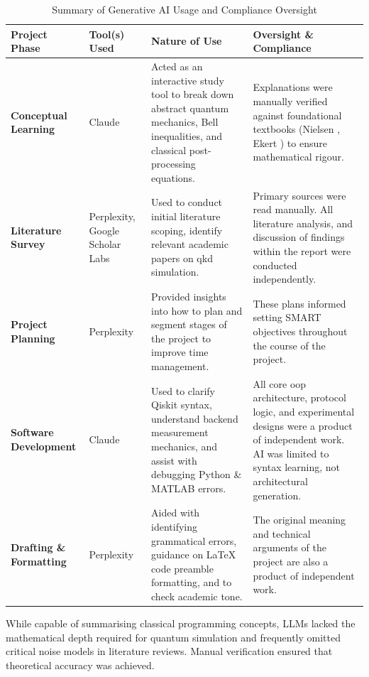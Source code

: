 \documentclass[11pt, a4paper]{report}
\renewcommand{\footnotesize}{\fontsize{9}{10}\selectfont}
\begin{document}
\begin{table}[htbp]
    \centering
    \caption{Summary of Generative AI Usage and Compliance Oversight}
    \label{tab:ai_usage}
    \footnotesize
    \begin{tabularx}{\linewidth}{@{}l l X X@{}}
        \toprule
        \textbf{Project Phase} & \textbf{Tool(s) Used} & \textbf{Nature of Use} & \textbf{Oversight \& Compliance} \\
        \midrule
        \textbf{Conceptual Learning} & Claude & Acted as an interactive study tool to break down abstract quantum mechanics, Bell inequalities, and classical post-processing equations. & Explanations were manually verified against foundational textbooks (Nielsen \cite{QKDbible}, Ekert \cite{ekertQI}) to ensure mathematical rigour. \\
        \addlinespace
        \textbf{Literature Survey} & Perplexity, Google Scholar Labs & Used to conduct initial literature scoping, identify relevant academic papers on \gls{qkd} simulation. & Primary sources were read manually. All literature analysis, and discussion of findings within the report were conducted independently. \\
        \addlinespace
        \textbf{Project Planning} & Perplexity & Provided insights into how to plan and segment stages of the project to improve time management. & These plans informed setting SMART objectives throughout the course of the project. \\
        \addlinespace
        \textbf{Software Development} & Claude & Used to clarify Qiskit syntax, understand backend measurement mechanics, and assist with debugging Python \& MATLAB errors. & All core \gls{oop} architecture, protocol logic, and experimental designs were a product of independent work. AI was limited to syntax learning, not architectural generation. \\
        \addlinespace
        \textbf{Drafting \& Formatting} & Perplexity & Aided with identifying grammatical errors, guidance on LaTeX code preamble formatting, and to check academic tone. & The original meaning and technical arguments of the project are also a product of independent work. \\
        \bottomrule
    \end{tabularx}
\end{table}

While capable of summarising classical programming concepts, LLMs lacked the mathematical depth required for quantum simulation and frequently omitted critical noise models in literature reviews. Manual verification ensured that theoretical accuracy was achieved.
\end{document}
